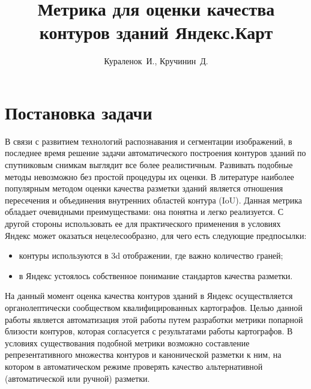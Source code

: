 \documentclass[12pt]{article}
\title{Метрика для оценки качества контуров зданий Яндекс.Карт}
\author{Кураленок~И., Кручинин~Д.}
\begin{document}
\maketitle

\section{Постановка задачи}
В связи с развитием технологий распознавания и сегментации изображений, в последнее время решение задачи автоматического построения контуров зданий по спутниковым снимкам выглядит все более реалистичным. Развивать подобные методы невозможно без простой процедуры их оценки. В литературе наиболее популярным методом оценки качества разметки зданий является отношения пересечения и объединения внутренних областей контура (IoU). Данная метрика обладает очевидными преимуществами: она понятна и легко реализуется. С другой стороны использовать ее для практического применения в условиях Яндекс может оказаться нецелесообразно, для чего есть следующие предпосылки:
\begin{itemize}
	\item контуры используются в 3d отображении, где важно количество граней;
	\item в Яндекс устоялось собственное понимание стандартов качества разметки.
\end{itemize}
На данный момент оценка качества контуров зданий в Яндекс осуществляется органолептически сообществом квалифицированных картографов. Целью данной работы является автоматизация этой работы путем разработки метрики попарной близости контуров, которая согласуется с результатами работы картографов. В условиях существования подобной метрики возможно составление репрезентативного множества контуров и канонической разметки к ним, на котором в автоматическом режиме проверять качество альтернативной (автоматической или ручной) разметки.
\end{document}
